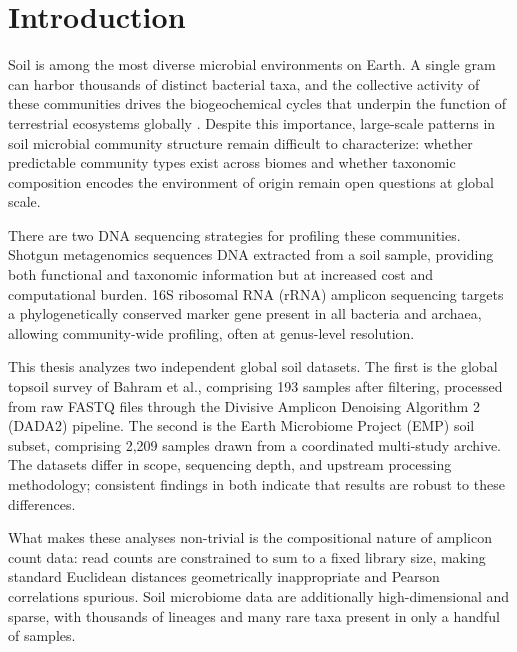 \documentclass[12pt, oneside]{report}
\begin{document}
\setcounter{page}{1}

\chapter{Introduction}

Soil is among the most diverse microbial environments on Earth. A single gram can
harbor thousands of distinct bacterial taxa, and the collective activity of these communities
drives the biogeochemical cycles that underpin the function of terrestrial ecosystems globally
\cite{fierer2006}. Despite this importance, large-scale patterns in soil microbial
community structure remain difficult to characterize: whether predictable community types
exist across biomes and whether taxonomic composition encodes the environment of origin remain open
questions at global scale.

There are two DNA sequencing strategies for profiling these communities. Shotgun
metagenomics sequences DNA extracted from a soil sample, providing both functional and
taxonomic information but at increased cost and computational burden. 16S ribosomal RNA (rRNA) amplicon sequencing targets a phylogenetically conserved marker
gene present in all bacteria and archaea, allowing community-wide profiling, often at genus-level
resolution.

This thesis analyzes two independent global soil datasets. The first is the global topsoil
survey of Bahram et al.\cite{bahram2018}, comprising 193 samples after filtering, processed from raw
FASTQ files through the Divisive Amplicon Denoising Algorithm 2 (DADA2) pipeline\cite{callahan2016}. The second is the Earth Microbiome Project (EMP)
soil subset\cite{thompson2017}, comprising 2,209 samples drawn from a coordinated
multi-study archive. The datasets differ in scope, sequencing depth, and upstream processing
methodology; consistent findings in both indicate that results are robust to these differences.

What makes these analyses non-trivial is the compositional nature of amplicon count data:
read counts are constrained to sum to a fixed library size, making standard Euclidean
distances geometrically inappropriate and Pearson correlations spurious\cite{aitchison1986,gloor2017}. Soil microbiome data are
additionally high-dimensional and sparse, with thousands of lineages and many rare taxa
present in only a handful of samples. 
\end{document}
